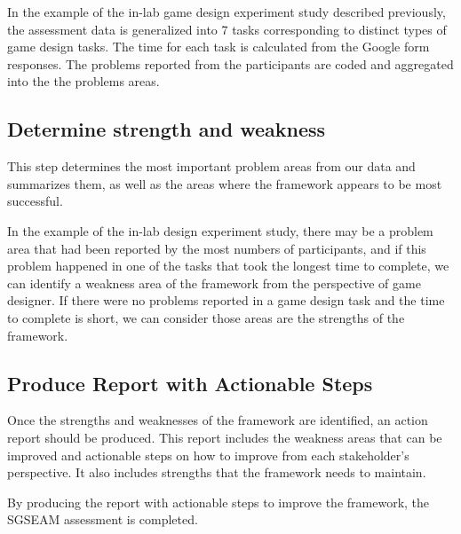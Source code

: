 In the example of the in-lab game design experiment study described previously, the assessment data is generalized into 7 tasks
corresponding to distinct types of game design tasks. The time for each task is calculated from the Google form responses. The 
problems reported from the participants are coded and aggregated into the the problems areas. 

\subsection{Determine strength and weakness}

This step determines the most important problem areas from our
data and summarizes them, as well as the areas where the framework
appears to be most successful.

In the example of the in-lab design experiment study, there may be a problem area that had been reported by the most numbers
of participants, and if this problem happened in one of the tasks that took the longest time to complete, we can identify a weakness 
area of the framework from the perspective of game designer. If there were no problems reported in a game design task and 
the time to complete is short, we can consider those areas are the strengths of the framework.

\subsection{Produce Report with Actionable Steps}

Once the strengths and weaknesses of the framework are identified, an action report should be produced.  This report
includes the weakness areas that can be improved and actionable steps
on how to improve from each stakeholder's perspective. It also
includes strengths that the framework needs to maintain.

By producing the report with actionable steps to improve the framework, the SGSEAM assessment is completed.  

